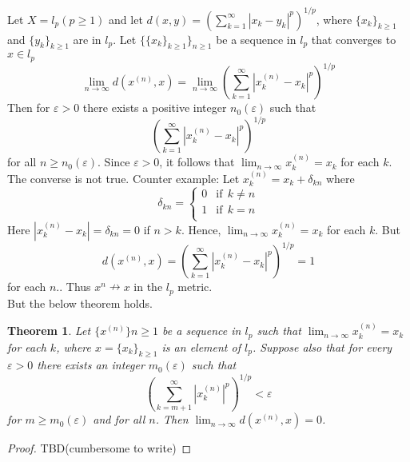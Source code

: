 \documentclass[12pt]{report}
\newtheorem{thm}{Theorem}
\begin{document}
\begin{enumerate}
    Let $X = l_p(p \geq 1)$ and let $d(x,y) = (\sum_{k=1}^{\infty}|x_k - y_k|^p)^{1/p}$, where $\{x_k\}_{k \geq 1}$ and $\{y_k\}_{k \geq 1}$ are in $l_p$. Let $\{\{x_k\}_{k\geq 1}\}_{n \geq 1}$ be a sequence in $l_p$ that converges to $x \in l_p$
    $$ \lim_{n \to \infty}d(x^{(n)}, x) = \lim_{n \to \infty}\left(\sum_{k=1}^{\infty}|x_k^{(n)} - x_k|^p\right)^{1/p}$$
    Then for $\varepsilon > 0$ there exists a positive integer $n_0(\varepsilon)$ such that $$ \left(\sum_{k=1}^{\infty}|x_k^{(n)} - x_k|^p\right)^{1/p}$$
    for all $ n \geq n_0(\varepsilon)$. Since $\varepsilon > 0$, it follows that $ \lim_{n \to \infty}x_k^{(n)} = x_k$ for each $k$.\\
    The converse is not true. Counter example: Let $x_k^{(n)} = x_k + \mathcal{\delta}_{kn}$ where 
    $$ \mathcal{\delta}_{kn} = \begin{cases}
        0 & \text{if}~~k \neq n\\
        1 & \text{if}~~k = n\\
    \end{cases} 
    $$
    Here $ |x_k^{(n)} - x_k| = \mathcal{\delta}_{kn} = 0$ if $n > k$. Hence, $\lim_{n \to \infty} x_k^{(n)} = x_k$ for each $k$. But
    $$ d(x^{(n)},x) = \left(\sum_{k=1}^{\infty}|x_k^{(n)} - x_k|^p\right)^{1/p} = 1 $$
    for each $n$.. Thus $x^n \nrightarrow x$ in the $l_p$ metric.\\
    But the below theorem holds.
\end{enumerate}
\begin{thm}
    Let $\{x^{(n)}\}{n \geq 1}$ be a sequence in $l_p$ such that $\lim_{n \to \infty}x_k^{(n)} = x_k$ for each $k$, where $x = \{x_k\}_{k \geq 1}$ is an element of $l_p$. Suppose also that for every $ \varepsilon > 0$ there exists an integer $m_0(\varepsilon)$ such that
    $$ \left(\sum\limits_{k = m+1}^{\infty} |x_k^{(n)}|^p \right)^{1/p} < \varepsilon$$ for $m \geq m_0(\varepsilon)$ and for all $n$. Then $\lim_{n \to \infty}d(x^{(n)}, x) = 0$.
\end{thm}
\begin{proof}
    TBD(cumbersome to write)
\end{proof}
\end{document}
